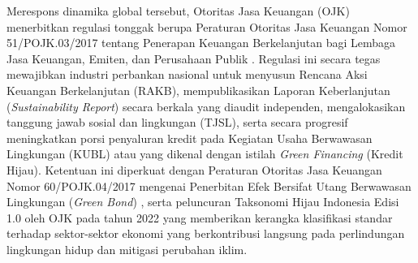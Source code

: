 \documentclass[12pt,a4paper]{article}
\numberwithin{equation}{section}
\begin{document}
\noindent
Merespons dinamika global tersebut, Otoritas Jasa Keuangan (OJK) menerbitkan regulasi tonggak berupa Peraturan Otoritas Jasa Keuangan Nomor 51/POJK.03/2017 tentang Penerapan Keuangan Berkelanjutan bagi Lembaga Jasa Keuangan, Emiten, dan Perusahaan Publik \citep{OJK2017}. Regulasi ini secara tegas mewajibkan industri perbankan nasional untuk menyusun Rencana Aksi Keuangan Berkelanjutan (RAKB), mempublikasikan Laporan Keberlanjutan (\emph{Sustainability Report}) secara berkala yang diaudit independen, mengalokasikan tanggung jawab sosial dan lingkungan (TJSL), serta secara progresif meningkatkan porsi penyaluran kredit pada Kegiatan Usaha Berwawasan Lingkungan (KUBL) atau yang dikenal dengan istilah \emph{Green Financing} (Kredit Hijau). Ketentuan ini diperkuat dengan Peraturan Otoritas Jasa Keuangan Nomor 60/POJK.04/2017 mengenai Penerbitan Efek Bersifat Utang Berwawasan Lingkungan (\emph{Green Bond}) \citep{OJK2017b}, serta peluncuran Taksonomi Hijau Indonesia Edisi 1.0 oleh OJK pada tahun 2022 \citep{OJK2022} yang memberikan kerangka klasifikasi standar terhadap sektor-sektor ekonomi yang berkontribusi langsung pada perlindungan lingkungan hidup dan mitigasi perubahan iklim.
\end{document}
